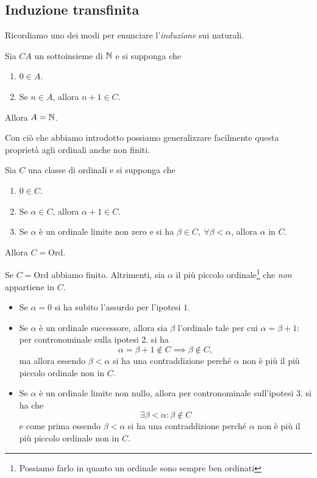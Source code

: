 \subsection{Induzione transfinita}
Ricordiamo uno dei modi per enunciare l'\textit{induzione} sui naturali. 
\begin{theoremaqed}[Induzione]
	Sia $CA$ un sottoinsieme di $\mathbb{N}$ e si supponga che
	\begin{enumerate}
		\item $0\in A$.
		\item Se $n\in A$, allora $n+1\in C$.
	\end{enumerate}
	Allora $A=\mathbb{N}$.
\end{theoremaqed}
Con ciò che abbiamo introdotto possiamo generalizzare facilmente questa proprietà agli ordinali anche non finiti.
\begin{theorema}
	Sia $C$ una classe di ordinali e si supponga che
	\begin{enumerate}
		\item $0\in C$.
		\item Se $\alpha\in C$, allora $\alpha+1\in C$.
		\item Se $\alpha$ è un ordinale limite non zero e si ha $\beta\in C,\ \forall \beta<\alpha$, allora $\alpha$ in $C$.
	\end{enumerate}
Allora $C=\mathrm{Ord}$.
\end{theorema}
\begin{demonstration}
	Se $C=\mathrm{Ord}$ abbiamo finito. Altrimenti, sia $\alpha$ il più piccolo ordinale\footnote{Possiamo farlo in quanto un ordinale sono sempre ben ordinati} che \textit{non} appartiene in $C$.
	\begin{itemize}
		\item Se $\alpha=0$ si ha subito l'assurdo per l'ipotesi $1$.
		\item Se $\alpha$ è un ordinale successore, allora sia $\beta$ l'ordinale tale per cui $\alpha=\beta+1$: per contronominale sulla ipotesi 2. si ha
		\begin{equation*}
			\alpha=\beta+1\notin C\implies \beta\notin C,
		\end{equation*}
		ma allora essendo $\beta<\alpha$ si ha una contraddizione perché $\alpha$ non è più il più piccolo ordinale non in $C$.
		\item Se $\alpha$ è un ordinale limite non nullo, allora per contronominale sull'ipotesi $3.$ si ha che
		\begin{equation*}
			\exists \beta<\alpha\colon\beta\notin C
		\end{equation*}
		e come prima essendo $\beta<\alpha$ si ha una contraddizione perché $\alpha$ non è più il più piccolo ordinale non in $C$.\qedhere
	\end{itemize}
\end{demonstration}
